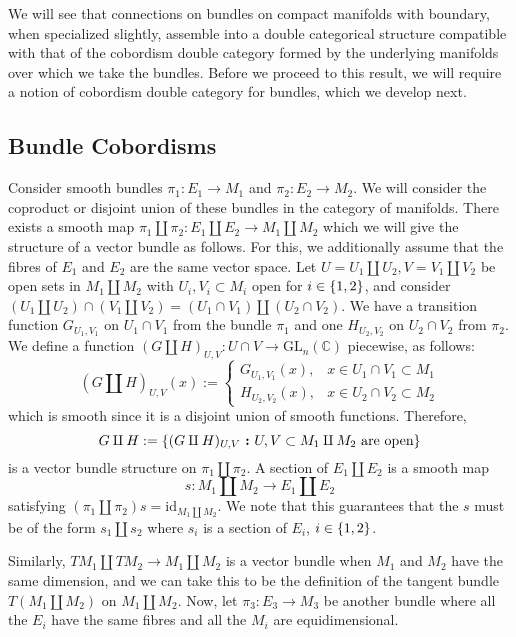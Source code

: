 \documentclass{amsart}
\newcommand{\C}{\mathbb{C}}
\renewcommand{\to}[1][]{\stackrel{#1}{\longrightarrow}}
\newcommand{\id}{\text{id}}
\newcommand{\curly}[1]{\left\{ #1 \right\}}
\newcommand{\set}[2][]{\ifthenelse{\equal{#1}{}}
                                  {\curly{#2}}
                                  {\curly{#1\ \textbf{:}\ #2}}}
\newcommand{\GL}{\text{GL}}
\numberwithin{thm}{section}
\theoremstyle{definition}
\begin{document}
We will see that connections on bundles on compact manifolds with boundary, when
specialized slightly, assemble into a double categorical structure compatible
with that of the cobordism double category formed by the underlying manifolds
over which we take the bundles. Before we proceed to this result, we will
require a notion of cobordism double category for bundles, which we develop
next.

% 

\subsection{Bundle Cobordisms}\label{subsec:bund_cob}

Consider smooth bundles $\pi_1 : E_1 \to M_1$ and $\pi_2 : E_2 \to M_2$. We will
consider the coproduct or disjoint union of these bundles in the category of
manifolds. There exists a smooth map
$\pi_1 \amalg \pi_2 : E_1 \amalg E_2 \to M_1 \amalg M_2$ which we will give the
structure of a vector bundle as follows. For this, we additionally assume that
the fibres of $E_1$ and $E_2$ are the same vector space. Let
$U = U_1 \amalg U_2, V = V_1 \amalg V_2$ be open sets in $M_1 \amalg M_2$ with
$U_i, V_i \subset M_i$ open for $i \in \set{1, 2}$, and consider
$(U_1 \amalg U_2) \cap (V_1 \amalg V_2) = (U_1 \cap V_1) \amalg (U_2 \cap V_2)$.
We have a transition function $G_{U_1, V_1}$ on $U_1 \cap V_1$ from the bundle
$\pi_1$ and one $H_{U_2, V_2}$ on $U_2 \cap V_2$ from $\pi_2$. We define a
function $(G \amalg H)_{U, V} : U \cap V \to \GL_n(\C)$ piecewise, as
follows:
\[
  (G \amalg H)_{U, V}(x) := \begin{cases}
    G_{U_1, V_1}(x), & x \in U_1 \cap V_1 \subset M_1 \\
    H_{U_2, V_2}(x), & x \in U_2 \cap V_2 \subset M_2
  \end{cases}
\]
which is smooth since it is a disjoint union of smooth functions. Therefore,
\[
  G \amalg H := \set[(G \amalg H)_{U, V}]
                    {U, V \subset M_1 \amalg M_2 \text{ are open}}
\]
is a vector bundle structure on $\pi_1 \amalg \pi_2$. A section of
$E_1 \amalg E_2$ is a smooth map
\[
  s : M_1 \amalg M_2 \to E_1 \amalg E_2
\]
satisfying $(\pi_1 \amalg \pi_2)s = \id_{M_1 \amalg M_2}$. We note that this
guarantees that the $s$ must be of the form $s_1 \amalg s_2$ where $s_i$ is a
section of $E_i$, $i \in \set{1, 2}$.

Similarly, $TM_1 \amalg TM_2 \to M_1 \amalg M_2$ is a vector bundle when $M_1$
and $M_2$ have the same dimension, and we can take this to be the definition of
the tangent bundle $T(M_1 \amalg M_2)$ on $M_1 \amalg M_2$. Now, let
$\pi_3 : E_3 \to M_3$ be another bundle where all the $E_i$ have the same fibres
and all the $M_i$ are equidimensional.
\end{document}
